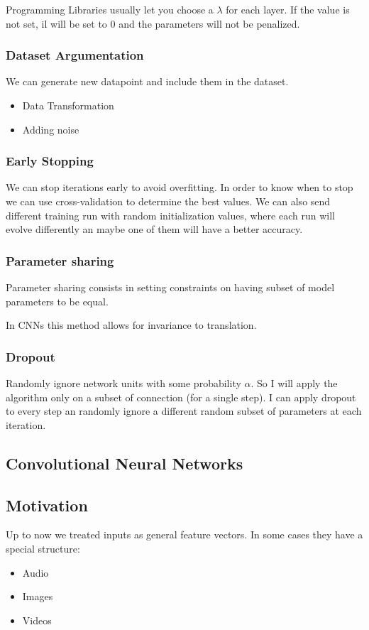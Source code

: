 Programming Libraries usually let you choose a $\lambda$ for each layer. If the value is not set, il will be set to $0$ and the parameters will not be penalized.

\subsubsection{Dataset Argumentation}
We can generate new datapoint and include them in the dataset.
\begin{itemize}
    \item Data Transformation
    \item Adding noise
\end{itemize}

\subsubsection{Early Stopping}
We can stop iterations early to avoid overfitting. In order to know when to stop we can use cross-validation to determine the best values. We can also send different training run with random initialization values, where each run will evolve differently an maybe one of them will have a better accuracy.

\subsubsection{Parameter sharing}
Parameter sharing consists in setting constraints on having subset of model parameters to be equal.

In CNNs this method allows for invariance to translation.

\subsubsection{Dropout}
Randomly ignore network units with some probability $\alpha$. So I will apply the algorithm only on a subset of connection (for a single step). I can apply dropout to every step an randomly ignore a different random subset of parameters at each iteration.

\subsection{Convolutional Neural Networks}

\subsection{Motivation}
Up to now we treated inputs as general feature vectors. In some cases they have a special structure:
\begin{itemize}
    \item Audio
    \item Images
    \item Videos
\end{itemize}

